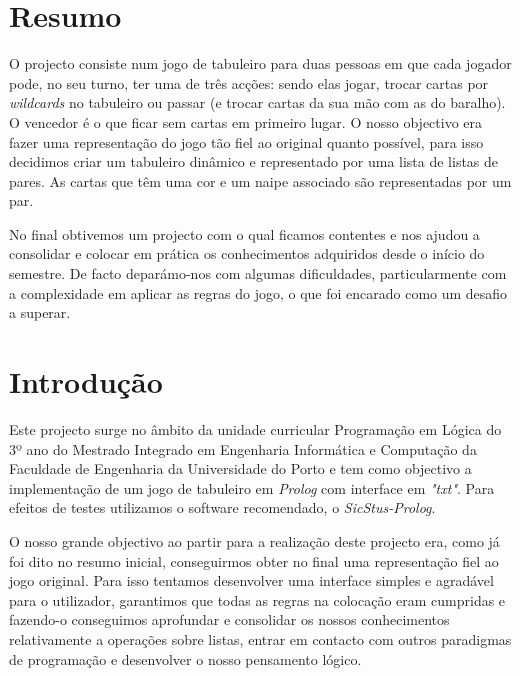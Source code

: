 \documentclass[a4paper]{article}
\begin{document}
	\newpage

	\section{Resumo}
	\normalsize


O projecto consiste num jogo de tabuleiro para duas pessoas em que cada jogador pode, no seu turno, ter uma de três acções: sendo elas jogar, trocar cartas por \textit{wildcards} no tabuleiro ou passar (e trocar cartas da sua mão com as do baralho). O vencedor é o que ficar sem cartas em primeiro lugar.
O nosso objectivo era fazer uma representação do jogo tão fiel ao original quanto possível, para isso decidimos criar um tabuleiro dinâmico e representado por uma lista de listas de pares. As cartas que têm uma cor e um naipe associado são representadas por um par.


No final obtivemos um projecto com o qual ficamos contentes e nos ajudou a consolidar e colocar em prática os conhecimentos adquiridos desde o início do semestre. De facto deparámo-nos com algumas dificuldades, particularmente com a complexidade em aplicar as regras do jogo, o que foi encarado como um desafio a superar.

	\newpage

	\tableofcontents	

	\newpage

	\section{Introdução}

 Este projecto surge no âmbito da unidade curricular Programação em Lógica do 3º ano do Mestrado Integrado em Engenharia Informática e Computação da Faculdade de Engenharia da Universidade do Porto e tem como objectivo a implementação de um jogo de tabuleiro em \textit{Prolog} com interface em \textit{"txt"}. Para efeitos de testes utilizamos o software recomendado, o \textit{SicStus-Prolog}.

O nosso grande objectivo ao partir para a realização deste projecto era, como já foi dito no resumo inicial, conseguirmos obter no final uma representação fiel ao jogo original. Para isso tentamos desenvolver uma interface simples e agradável para o utilizador, garantimos que todas as regras na colocação eram cumpridas e fazendo-o conseguimos aprofundar e consolidar os nossos conhecimentos relativamente a operações sobre listas, entrar em contacto com outros paradigmas de programação e desenvolver o nosso pensamento lógico.
\end{document}
